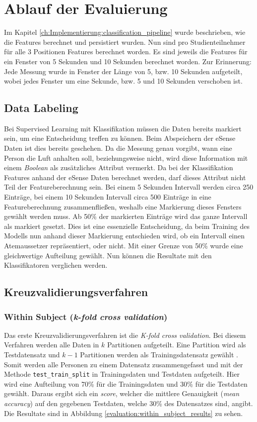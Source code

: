 \section{Ablauf der Evaluierung}
Im Kapitel \ref{ch:Implementierung:classification_pipeline} wurde beschrieben, wie die Features berechnet und persistiert wurden. 
Nun sind pro Studienteilnehmer für alle 3 Positionen Features berechnet worden. 
Es sind jeweils die Features für ein Fenster von 5 Sekunden und 10 Sekunden berechnet worden.
Zur Erinnerung: Jede Messung wurde in Fenster der Länge von 5, bzw. 10 Sekunden aufgeteilt, wobei jedes Fenster um eine Sekunde, bzw. 5 und 10 Sekunden verschoben ist.

\subsection{Data Labeling}
Bei Supervised Learning mit Klassifikation müssen die Daten bereits markiert sein, um eine Entscheidung treffen zu können. 
Beim Abspeichern der eSense Daten ist dies bereits geschehen.
Da die Messung genau vorgibt, wann eine Person die Luft anhalten soll, beziehungsweise nicht, wird diese Information mit einem \textit{Boolean} als zusätzliches Attribut vermerkt.
Da bei der Klassifikation Features anhand der eSense Daten berechnet werden, darf dieses Attribut nicht Teil der Featureberechnung sein.
Bei einem 5 Sekunden Intervall werden circa 250 Einträge, bei einem 10 Sekunden Intervall circa 500 Einträge in eine Featureberechnung zusammenfließen, weshalb eine Markierung dieses Fensters gewählt werden muss.
Ab 50\% der markierten Einträge wird das ganze Intervall als markiert gesetzt.
Dies ist eine essenzielle Entscheidung, da beim Training des Modells nun anhand dieser Markierung entschieden wird, ob ein Intervall einen Atemaussetzer repräsentiert, oder nicht.
Mit einer Grenze von 50\% wurde eine gleichwertige Aufteilung gewählt.
Nun können die Resultate mit den Klassifikatoren verglichen werden.

\subsection{Kreuzvalidierungsverfahren}
\subsubsection{Within Subject (\textit{k-fold cross validation})}
Das erste Kreuzvalidierungsverfahren ist die \textit{K-fold cross validation}.
Bei diesem Verfahren werden alle Daten in $k$ Partitionen aufgeteilt.
Eine Partition wird als Testdatensatz und $k-1$ Partitionen werden als Trainingsdatensatz gewählt \cite{neumannMaschineLearningKIT2020}.
Somit werden alle Personen zu einem Datensatz zusammengefasst und mit der Methode \texttt{test\_train\_split} in Trainingsdaten und Testdaten aufgeteilt.
Hier wird eine Aufteilung von 70\% für die Trainingsdaten und 30\% für die Testdaten gewählt. 
Daraus ergibt sich ein \textit{score}, welcher die mittlere Genauigkeit (\textit{mean accuracy}) auf den gegebenen Testdaten, welche 30\% des Datensatzes sind, angibt.
Die Resultate sind in Abbildung \ref{evaluation:within_subject_results} zu sehen.

